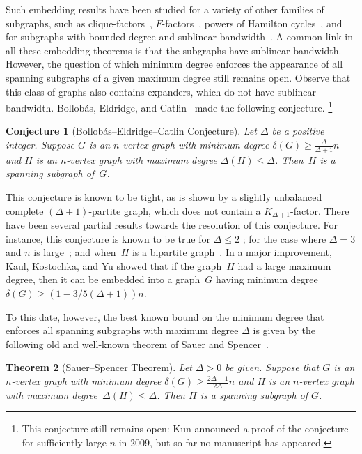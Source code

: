 \documentclass[final]{article}
\newtheorem{theorem}{Theorem}[section]
\newtheorem{conj}[theorem]{Conjecture}
\theoremstyle{definition}
\begin{document}
Such embedding results have been studied for a variety of other families of
subgraphs, such as clique-factors~\cite{Hajnal_szemeredi},
$F$-factors~\cite{F_factors}, powers of Hamilton
cycles~\cite{powers_of_hcycles}, and for subgraphs with bounded
degree and sublinear bandwidth~\cite{dense_bandwidth_theorem}. A
common link in all these embedding theorems is that the subgraphs have sublinear bandwidth. However, the question of which minimum degree
enforces the appearance of all spanning subgraphs of a given maximum
degree still remains open. Observe that this class of graphs also
contains expanders, which do not have sublinear bandwidth. Bollob\'as,
Eldridge, and Catlin~\cite{Bollobas_Eldridge_version_conj,
  catlin_version_conj} made the following conjecture. \footnote{ This conjecture still remains open: Kun announced a proof of the conjecture for sufficiently large $n$ in 2009, but so far no manuscript has appeared.}

\begin{conj}[Bollob\'as--Eldridge--Catlin Conjecture]
  \label{conj:BEC} Let $\Delta$ be a positive
  integer. Suppose $G$ is an $n$-vertex graph with minimum degree
  $\delta(G) \geq \tfrac{\Delta}{\Delta+1}n$ and $H$ is an $n$-vertex
  graph with maximum degree $\Delta(H) \leq \Delta$.  Then~$H$ is a
  spanning subgraph of~$G$.
\end{conj}

This conjecture is known to be tight, as is shown by a slightly unbalanced
complete $(\Delta+1)$-partite graph, which does not contain a
$K_{\Delta+1}$-factor. There have been several partial results towards
the resolution of this conjecture. For instance, this conjecture is
known to be true for $\Delta \leq 2$ \cite{BEC_Delta2,BEC_Delta22}; for
the case where $\Delta = 3$ and $n$ is large~\cite{BEC_Delta3}; and
when~$H$ is a bipartite graph~\cite{BEC_bipartite}.  In a major improvement, Kaul, Kostochka, and Yu \cite{Kaul_kostocha_yu} showed that if the graph~$H$ had a large maximum degree, then it can be embedded into a graph~$G$ having minimum degree $\delta(G) \geq (1 - 3/5(\Delta+1))n$. 

To this date,
however, the best known bound on the minimum degree that enforces all
spanning subgraphs with maximum degree $\Delta$ is given by the
following old and well-known theorem of Sauer and
Spencer~\cite{Sauer_spencer}.

\begin{theorem}[Sauer--Spencer Theorem]
  \label{thm:Sauer_Spencer} Let $\Delta > 0$ be given. Suppose that $G$ is an $n$-vertex graph with minimum degree
  $\delta(G) \geq \frac{2\Delta-1}{2\Delta}n$ and $H$ is an
  $n$-vertex graph with maximum degree~$\Delta(H) \leq \Delta$. Then
  $H$ is a spanning subgraph of $G$.
\end{theorem}
\end{document}
